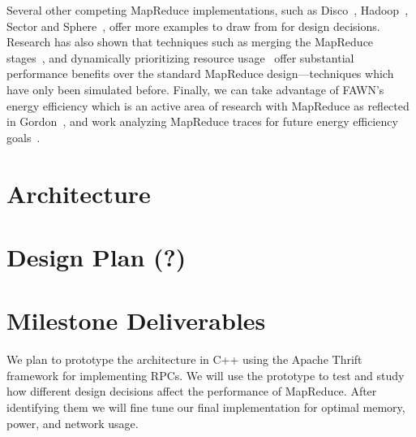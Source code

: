 \documentclass[10pt,letter,final,article,twocolumn]{article} %
\begin{document}
Several other competing MapReduce implementations, such as
Disco~\cite{disco10}, Hadoop~\cite{hadoop10}, Sector and
Sphere~\cite{sphere09}, offer more examples to draw from for design
decisions.  Research has also shown that techniques such as merging the
MapReduce stages~\cite{barrier10}, and dynamically prioritizing resource
usage~\cite{sandholm09} offer substantial performance benefits over the
standard MapReduce design---techniques which have only been simulated
before.  Finally, we can take advantage of FAWN's energy efficiency which is
an active area of research with MapReduce as reflected in
Gordon~\cite{gordon09},  and work analyzing MapReduce traces for future
energy efficiency goals~\cite{chen10}.

\section{Architecture}

\section{Design Plan (?)}

\section{Milestone Deliverables}
We plan to prototype the architecture in C++ using the Apache Thrift framework for implementing RPCs. We will use the prototype to test and study how different design decisions affect the performance of MapReduce. After identifying them we will fine tune our final implementation for optimal memory, power, and network usage.




\end{document}
